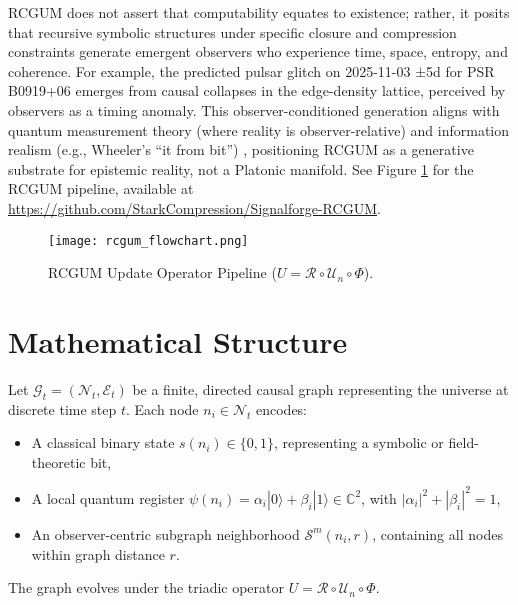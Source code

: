 \documentclass[11pt]{article}
\begin{document}
RCGUM does not assert that computability equates to existence; rather, it posits that recursive symbolic structures under specific closure and compression constraints generate emergent observers who experience time, space, entropy, and coherence. For example, the predicted pulsar glitch on 2025-11-03 ±5d for PSR B0919+06 emerges from causal collapses in the edge-density lattice, perceived by observers as a timing anomaly. This observer-conditioned generation aligns with quantum measurement theory (where reality is observer-relative) and information realism (e.g., Wheeler’s “it from bit”) \citep{wheeler}, positioning RCGUM as a generative substrate for epistemic reality, not a Platonic manifold. See Figure \ref{fig:flowchart} for the RCGUM pipeline, available at \url{https://github.com/StarkCompression/Signalforge-RCGUM}.

\begin{figure}
    \centering
    \texttt{[image: rcgum\_flowchart.png]}
    \caption{RCGUM Update Operator Pipeline (\( U = \mathcal{R} \circ \mathcal{U}_n \circ \Phi \)).}
    \label{fig:flowchart}
\end{figure}

\section{Mathematical Structure}
Let \( \mathcal{G}_t = (\mathcal{N}_t, \mathcal{E}_t) \) be a finite, directed causal graph representing the universe at discrete time step \( t \). Each node \( n_i \in \mathcal{N}_t \) encodes:
\begin{itemize}
    \item A classical binary state \( s(n_i) \in \{0, 1\} \), representing a symbolic or field-theoretic bit,
    \item A local quantum register \( \psi(n_i) = \alpha_i|0\rangle + \beta_i|1\rangle \in \mathbb{C}^2 \), with \( |\alpha_i|^2 + |\beta_i|^2 = 1 \),
    \item An observer-centric subgraph neighborhood \( \mathcal{S}^m(n_i, r) \), containing all nodes within graph distance \( r \).
\end{itemize}
The graph evolves under the triadic operator \( U = \mathcal{R} \circ \mathcal{U}_n \circ \Phi \).
\end{document}
